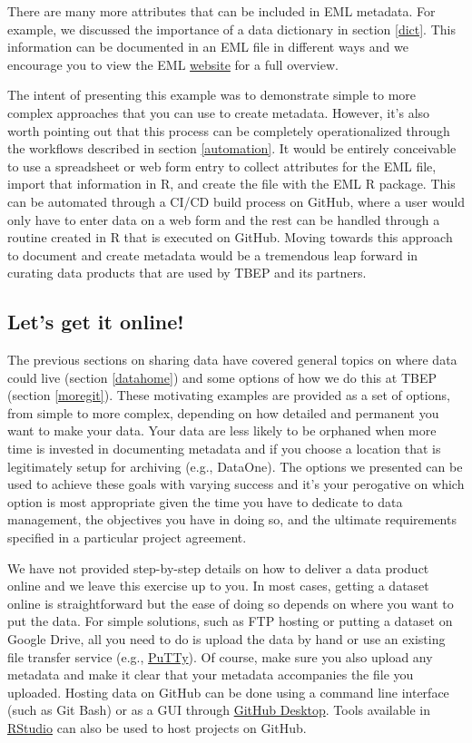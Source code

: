 \documentclass[
]{book}
\begin{document}
There are many more attributes that can be included in EML metadata. For example, we discussed the importance of a data dictionary in section \ref{dict}. This information can be documented in an EML file in different ways and we encourage you to view the EML \href{https://docs.ropensci.org/EML/}{website} for a full overview.

The intent of presenting this example was to demonstrate simple to more complex approaches that you can use to create metadata. However, it's also worth pointing out that this process can be completely operationalized through the workflows described in section \ref{automation}. It would be entirely conceivable to use a spreadsheet or web form entry to collect attributes for the EML file, import that information in R, and create the file with the EML R package. This can be automated through a CI/CD build process on GitHub, where a user would only have to enter data on a web form and the rest can be handled through a routine created in R that is executed on GitHub. Moving towards this approach to document and create metadata would be a tremendous leap forward in curating data products that are used by TBEP and its partners.

\subsection{Let's get it online!}\label{lets-get-it-online}

The previous sections on sharing data have covered general topics on where data could live (section \ref{datahome}) and some options of how we do this at TBEP (section \ref{moregit}). These motivating examples are provided as a set of options, from simple to more complex, depending on how detailed and permanent you want to make your data. Your data are less likely to be orphaned when more time is invested in documenting metadata and if you choose a location that is legitimately setup for archiving (e.g., DataOne). The options we presented can be used to achieve these goals with varying success and it's your perogative on which option is most appropriate given the time you have to dedicate to data management, the objectives you have in doing so, and the ultimate requirements specified in a particular project agreement.

We have not provided step-by-step details on how to deliver a data product online and we leave this exercise up to you. In most cases, getting a dataset online is straightforward but the ease of doing so depends on where you want to put the data. For simple solutions, such as FTP hosting or putting a dataset on Google Drive, all you need to do is upload the data by hand or use an existing file transfer service (e.g., \href{https://www.putty.org/}{PuTTy}). Of course, make sure you also upload any metadata and make it clear that your metadata accompanies the file you uploaded. Hosting data on GitHub can be done using a command line interface (such as Git Bash) or as a GUI through \href{https://desktop.github.com/}{GitHub Desktop}. Tools available in \href{https://happygitwithr.com/rstudio-git-github.html}{RStudio} can also be used to host projects on GitHub.
\end{document}
